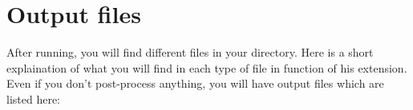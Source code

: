 \section{Output files} \label{post}
After running, you will find different files in your directory. Here is a short explaination of what you will find in each type of file in function of his extension.\\



Even if you don't post-process anything, you will have output files which are listed here:

